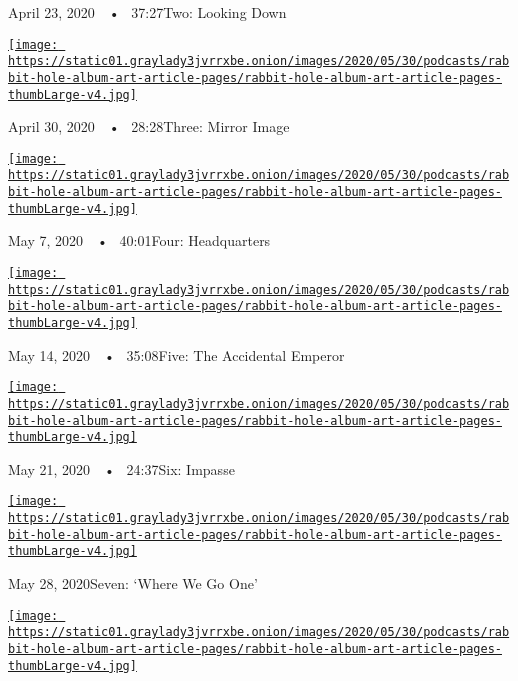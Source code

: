 April 23, 2020~~•~ 37:27Two: Looking Down

\href{https://www.nytimes3xbfgragh.onion/2020/04/30/podcasts/rabbit-hole-internet-youtube-virus.html?action=click\&module=audio-series-bar\&region=header\&pgtype=Article}{\texttt{[image: https://static01.graylady3jvrrxbe.onion/images/2020/05/30/podcasts/rabbit-hole-album-art-article-pages/rabbit-hole-album-art-article-pages-thumbLarge-v4.jpg]}}

April 30, 2020~~•~ 28:28Three: Mirror Image

\href{https://www.nytimes3xbfgragh.onion/2020/05/07/podcasts/rabbit-hole-youtube-susan-wojcicki-virus.html?action=click\&module=audio-series-bar\&region=header\&pgtype=Article}{\texttt{[image: https://static01.graylady3jvrrxbe.onion/images/2020/05/30/podcasts/rabbit-hole-album-art-article-pages/rabbit-hole-album-art-article-pages-thumbLarge-v4.jpg]}}

May 7, 2020~~•~ 40:01Four: Headquarters

\href{https://www.nytimes3xbfgragh.onion/2020/05/14/podcasts/13rabbit-hole-internet-PewDiePie-virus.html?action=click\&module=audio-series-bar\&region=header\&pgtype=Article}{\texttt{[image: https://static01.graylady3jvrrxbe.onion/images/2020/05/30/podcasts/rabbit-hole-album-art-article-pages/rabbit-hole-album-art-article-pages-thumbLarge-v4.jpg]}}

May 14, 2020~~•~ 35:08Five: The Accidental Emperor

\href{https://www.nytimes3xbfgragh.onion/2020/05/21/podcasts/rabbit-hole-PewDiePie-youtube-virus.html?action=click\&module=audio-series-bar\&region=header\&pgtype=Article}{\texttt{[image: https://static01.graylady3jvrrxbe.onion/images/2020/05/30/podcasts/rabbit-hole-album-art-article-pages/rabbit-hole-album-art-article-pages-thumbLarge-v4.jpg]}}

May 21, 2020~~•~ 24:37Six: Impasse

\href{https://www.nytimes3xbfgragh.onion/2020/05/28/podcasts/rabbit-hole-qanon-conspiracy-theory-virus.html?action=click\&module=audio-series-bar\&region=header\&pgtype=Article}{\texttt{[image: https://static01.graylady3jvrrxbe.onion/images/2020/05/30/podcasts/rabbit-hole-album-art-article-pages/rabbit-hole-album-art-article-pages-thumbLarge-v4.jpg]}}

May 28, 2020Seven: `Where We Go One'

\href{https://www.nytimes3xbfgragh.onion/2020/06/04/podcasts/rabbit-hole-qanon-youtube-tiktok-virus.html?action=click\&module=audio-series-bar\&region=header\&pgtype=Article}{\texttt{[image: https://static01.graylady3jvrrxbe.onion/images/2020/05/30/podcasts/rabbit-hole-album-art-article-pages/rabbit-hole-album-art-article-pages-thumbLarge-v4.jpg]}}

